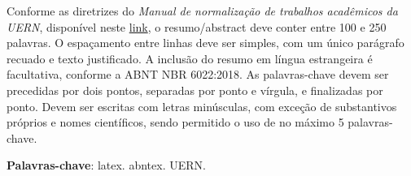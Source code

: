 \documentclass[
article,			%
12pt,				%
oneside,			%
a4paper,			%
english,			%
brazil,				%
sumario=tradicional
]{abntex2}
\begin{document}
	
	
	\frenchspacing 
	
	\maketitle
	
	\begin{resumoumacoluna}
		Conforme as diretrizes do \emph{Manual de normalização de trabalhos acadêmicos da UERN}, disponível neste \href{https://www.uern.br/controledepaginas/manualtcc/arquivos/6762manual_de_tcc_uern_2022_finalizado.pdf}{link}, o resumo/abstract deve conter entre 100 e 250 palavras. O espaçamento entre linhas deve ser simples, com um único parágrafo recuado e texto justificado. A inclusão do resumo em língua estrangeira é facultativa, conforme a ABNT NBR 6022:2018. As palavras-chave devem ser precedidas por dois pontos, separadas por ponto e vírgula, e finalizadas por ponto. Devem ser escritas com letras minúsculas, com exceção de substantivos próprios e nomes científicos, sendo permitido o uso de no máximo 5 palavras-chave.
		
		\vspace{\onelineskip}
		
		\noindent
		\textbf{Palavras-chave}: latex. abntex. UERN.
	\end{resumoumacoluna}
	
\end{document}
